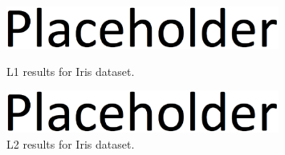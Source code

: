 \documentclass{article}
\begin{document}
\begin{figure}[H]
  \centering
  \begin{minipage}{0.48\textwidth}
  \centering
  \includegraphics[width=0.8\textwidth]{placeholder.eps}
  \caption{L1 results for Iris dataset.}
  \label{fig:l1-iris}
  \end{minipage}
  \hfill
  \begin{minipage}{0.48\textwidth}
  \centering
    \includegraphics[width=0.8\textwidth]{placeholder.eps}
  \caption{L2 results for Iris dataset.}
  \label{fig:l2-iris}
  \end{minipage}
  \hfill
\end{figure}
\end{document}
